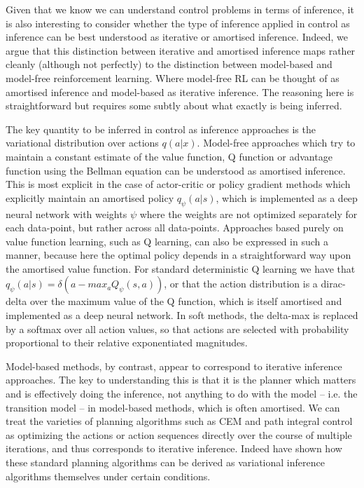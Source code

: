 Given that we know we can understand control problems in terms of inference, it is also interesting to consider whether the type of inference applied in control as inference can be best understood as iterative or amortised inference. Indeed, we argue that this distinction between iterative and amortised inference maps rather cleanly (although not perfectly) to the distinction between model-based and model-free reinforcement learning. Where model-free RL can be thought of as amortised inference and model-based as iterative inference. The reasoning here is straightforward but requires some subtly about what exactly is being inferred. 

The key quantity to be inferred in control as inference approaches is the variational distribution over actions $q(a | x)$. Model-free approaches which try to maintain a constant estimate of the value function, Q function or advantage function using the Bellman equation can be understood as amortised inference. This is most explicit in the case of actor-critic or policy gradient methods which explicitly maintain an amortised policy $q_\psi(a | s)$, which is implemented as a deep neural network with weights $\psi$ where the weights are not optimized separately for each data-point, but rather across all data-points. Approaches based purely on value function learning, such as Q learning, can also be expressed in such a manner, because here the optimal policy depends in a straightforward way upon the amortised value function. For standard deterministic Q learning we have that $q_\psi(a | s) = \delta(a - max_a Q_\psi(s,a))$, or that the action distribution is a dirac-delta over the maximum value of the Q function, which is itself amortised and implemented as a deep neural network. In soft methods, the delta-max is replaced by a softmax over all action values, so that actions are selected with probability proportional to their relative exponentiated magnitudes. 

Model-based methods, by contrast, appear to correspond to iterative inference approaches. The key to understanding this is that it is the planner which matters and is effectively doing the inference, not anything to do with the model -- i.e. the transition model -- in model-based methods, which  is often amortised. We can treat the varieties of planning algorithms such as CEM and path integral control as optimizing the actions or action sequences directly over the course of multiple iterations, and thus corresponds to iterative inference. Indeed \citet{okada_variational_2019} have shown how these standard planning algorithms can be derived as variational inference algorithms themselves under certain conditions.

